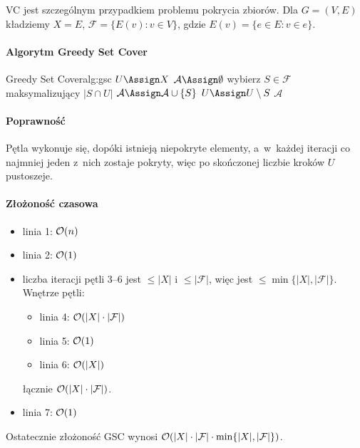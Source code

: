 \begin{remark}
	VC jest szczególnym przypadkiem problemu pokrycia zbiorów. Dla $G = (V, E)$ kładziemy $X = E$, $\mathcal{F} = \{E(v) : v \in V\}$, gdzie $E(v) = \{e \in E : v \in e\}$.
\end{remark}

\paragraph{Algorytm Greedy Set Cover}

\begin{alg}{Greedy Set Cover}{alg:gsc}
	\State $U \Assign X$ 
	\State $\mathcal{A} \Assign \emptyset$ 
	\State wybierz $S \in \mathcal{F}$ maksymalizujący $|S \cap U|$
	\State $\mathcal{A} \Assign \mathcal{A} \cup \{S\}$
	\State $U \Assign U \setminus S$
	\EndWhile
	\State \Return $\mathcal{A}$
	\EndFunction
\end{alg}

\paragraph{Poprawność}
Pętla wykonuje się, dopóki istnieją niepokryte elementy, a~w~każdej iteracji co najmniej jeden z~nich zostaje pokryty, więc po skończonej liczbie kroków $U$ pustoszeje.

\paragraph{Złożoność czasowa}
\begin{itemize}[nosep]
	\item linia 1: $\mathcal{O}(n)$
	\item linia 2: $\mathcal{O}(1)$
	\item liczba iteracji pętli 3--6 jest $\leq |X|$ i $\leq |\mathcal{F}|$, więc jest $\leq \min\{|X|, |\mathcal{F}|\}$. Wnętrze pętli:
	      \begin{itemize}[nosep]
		      \item linia 4: $\mathcal{O}(|X| \cdot |\mathcal{F}|)$
		      \item linia 5: $\mathcal{O}(1)$
		      \item linia 6: $\mathcal{O}(|X|)$
	      \end{itemize}
	      łącznie $\mathcal{O}(|X| \cdot |\mathcal{F}|)$.
	\item linia 7: $\mathcal{O}(1)$
\end{itemize}
Ostatecznie złożoność GSC wynosi $\mathcal{O}(|X| \cdot |\mathcal{F}| \cdot \min\{|X|, |\mathcal{F}|\})$.

